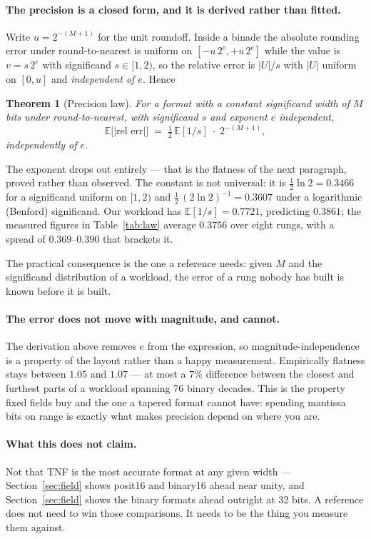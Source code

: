 \documentclass[11pt]{article}
\newtheorem{theorem}{Theorem}
\theoremstyle{definition}
\begin{document}
\paragraph{The precision is a closed form, and it is derived rather than fitted.}
Write $u = 2^{-(M+1)}$ for the unit roundoff. Inside a binade the absolute
rounding error under round-to-nearest is uniform on $[-u\,2^{e}, +u\,2^{e}]$
while the value is $v = s\,2^{e}$ with significand $s \in [1,2)$, so the relative
error is $|U|/s$ with $|U|$ uniform on $[0,u]$ and \emph{independent of $e$}.
Hence
\begin{theorem}[Precision law]\label{thm:law}
For a format with a constant significand width of $M$ bits under
round-to-nearest, with significand $s$ and exponent $e$ independent,
\[
  \mathbb{E}\bigl[|\text{rel err}|\bigr] \;=\; \tfrac{1}{2}\,\mathbb{E}[1/s]\;\cdot\;2^{-(M+1)} ,
\]
independently of $e$.
\end{theorem}
The exponent drops out entirely --- that is the flatness of the next paragraph,
proved rather than observed. The constant is not universal: it is
$\tfrac{1}{2}\ln 2 = 0.3466$ for a significand uniform on $[1,2)$ and
$\tfrac{1}{2}\,(2\ln 2)^{-1} = 0.3607$ under a logarithmic (Benford) significand.
Our workload has $\mathbb{E}[1/s] = 0.7721$, predicting $0.3861$; the measured
figures in Table~\ref{tab:law} average $0.3756$ over eight rungs, with a spread
of $0.369$--$0.390$ that brackets it.

The practical consequence is the one a reference needs: given $M$ and the
significand distribution of a workload, the error of a rung nobody has built is
known before it is built.

\paragraph{The error does not move with magnitude, and cannot.} The derivation
above removes $e$ from the expression, so magnitude-independence is a property of
the layout rather than a happy measurement. Empirically flatness stays between
$1.05$ and $1.07$ --- at most a $7\%$ difference between the closest and furthest
parts of a workload spanning 76 binary decades. This is the property fixed fields
buy and the one a tapered format cannot have: spending mantissa bits on range is
exactly what makes precision depend on where you are.

\paragraph{What this does not claim.} Not that TNF is the most accurate format
at any given width --- Section~\ref{sec:field} shows posit16 and binary16 ahead
near unity, and Section~\ref{sec:field} shows the binary formats ahead outright at
32 bits. A reference does not need to win those comparisons. It needs to be the
thing you measure them against.
\end{document}
